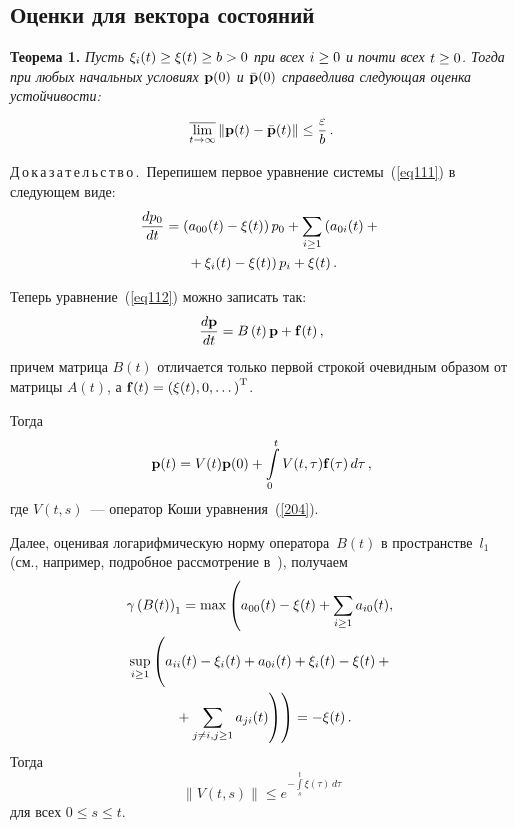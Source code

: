 \begin{multicols}{2}
\section{Оценки для вектора состояний}

\noindent
\textbf{Теорема 1.} \textit{Пусть $\xi_i(t) \hm\ge \xi(t) \ge b \hm>0$ при всех 
$i \hm\ge 0$ и почти всех $t \hm\ge 0$. Тогда при любых начальных условиях 
${\bf p}(0)$ и $\bar{\bf p}(0)$ справедлива следующая оценка устойчивости:}
\begin{equation*}
\overline{\lim_{t \to \infty}}\left\|\mathbf {p}(t)-{\bar{\mathbf {p}}}(t)\right\|\le \displaystyle\frac{\displaystyle \varepsilon\mathstrut}{\displaystyle b\mathstrut}\,.
\end{equation*}

\medskip


\noindent
Д\,о\,к\,а\,з\,а\,т\,е\,л\,ь\,с\,т\,в\,о\,.\ Перепишем первое уравнение сис\-те\-мы~(\ref{eq111}) 
в следующем виде:
\begin{multline*}
\displaystyle\frac{\displaystyle dp_0\mathstrut}{\displaystyle dt\mathstrut} = \left(a_{00}(t)-\xi(t)\right) p_0 +
\sum\limits_{i \ge 1} \left(a_{0i}(t)+{}\right.\\
\left.{}+ \xi_i(t)-\xi(t)\right)p_i +\xi(t) \,.  
\end{multline*}

Теперь уравнение~(\ref{eq112}) можно записать так:
\begin{equation}
\displaystyle\frac{\displaystyle d\mathbf {p}\mathstrut}{\displaystyle dt\mathstrut}=B\left( t\right) \mathbf {p} + {\bf f}(t)\,,
\label{203}
\end{equation}
причем матрица $B\left( t\right)$ отличается только первой строкой 
очевидным образом от матрицы $A\left( t\right)$, а 
${\bf f}(t) = \left(\xi(t),0,\dots\right)^{\mathrm{T}}$.

Тогда
\begin{equation}
\mathbf {p}(t)=V(t)\mathbf {p}(0)+\int\limits_0^t V(t,\tau){\bf f}(\tau) \, d\tau\,, 
\label{204}
\end{equation}
где  $V(t,s)$~--- оператор Коши уравнения~(\ref{204}).

Далее, оценивая логарифмическую норму оператора~$B(t)$ в пространстве~$l_1$ 
(см., например, подробное рассмотрение в~\cite{z08b, z95b, dzp}), получаем
\begin{multline*}
\gamma \left(B(t)\right)_{1} = 
\max\left(a_{00}(t)-\xi(t) + \sum_{i \ge 1} a_{i0}(t),\right.  \\
\sup\limits_{i\ge 1}\left(
\vphantom{\sum_{j\neq i,j\ge 1}}a_{ii}(t)-\xi_i(t)+ a_{0i}(t) + \xi_i(t) - \xi(t) +{}\right.\\
\left.\left.{}+ \sum_{j\neq i,j\ge 1} a_{ji}(t)\right)\right) = -\xi(t)\,.
\end{multline*}
Тогда
\begin{equation*}
\|V(t,s)\| \le  e^{-\int\limits_s^t \xi(\tau)\, d\tau}
\end{equation*}
для всех $0 \le s \le t$.


\end{multicols}
